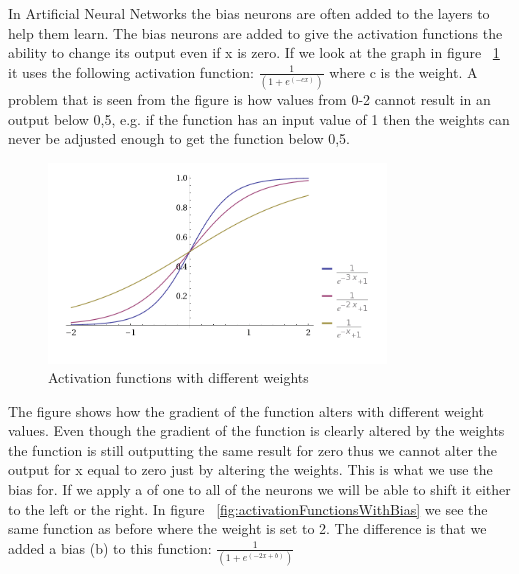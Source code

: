 In Artificial Neural Networks the bias neurons are often added to the layers to help them learn. The bias neurons are added to give the activation functions the ability to change its output even if x is zero. If we look at the graph in figure ~\ref{fig:activationFunctions} it uses the following activation function: \begin{math} \frac{1}{(1+e^{(-cx)})} \end{math} where c is the weight. A problem that is seen from the figure is how values from 0-2 cannot result in an output below 0,5, e.g. if the function has an input value of 1 then the weights can never be adjusted enough to get the function below 0,5.

\begin{figure}[!ht]
\centering
\includegraphics[width=0.8\textwidth ,natwidth=410,natheight=237]{billeder/ActivationFunctions.png}
\caption{Activation functions with different weights}
\label{fig:activationFunctions}
\end{figure}

The figure shows how the gradient of the function alters with different weight values. Even though the gradient of the function is clearly altered by the weights the function is still outputting the same result for zero thus we cannot alter the output for x equal to zero just by altering the weights. This is what we use the bias for. If we apply a  of one to all of the neurons we will be able to shift it either to the left or the right. In figure ~\ref{fig:activationFunctionsWithBias} we see the same function as before where the weight is set to 2. The difference is that we added a bias (b) to this function: \begin{math} \frac{1}{(1+e^{(-2x+b)})} \end{math} \cite[p. 165]{rojas1996neural}

